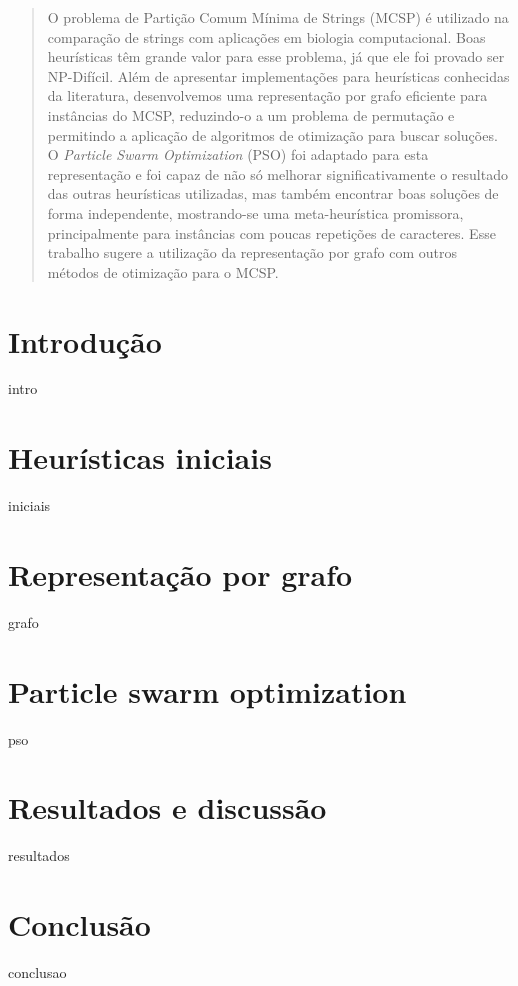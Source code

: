 \documentclass[11pt,twoside]{article}
\begin{document}

    \begin{abstract}
        O problema de Partição Comum Mínima de Strings (MCSP) é utilizado na comparação de strings com aplicações em biologia computacional. Boas heurísticas têm grande valor para esse problema, já que ele foi provado ser NP-Difícil. Além de apresentar implementações para heurísticas conhecidas da literatura, desenvolvemos uma representação por grafo eficiente para instâncias do MCSP, reduzindo-o a um problema de permutação e permitindo a aplicação de algoritmos de otimização para buscar soluções. O \textit{Particle Swarm Optimization} (PSO) foi adaptado para esta representação e foi capaz de não só melhorar significativamente o resultado das outras heurísticas utilizadas, mas também encontrar boas soluções de forma independente, mostrando-se uma meta-heurística promissora, principalmente para instâncias com poucas repetições de caracteres. Esse trabalho sugere a utilização da representação por grafo com outros métodos de otimização para o MCSP.
    \end{abstract}

    \raggedbottom

    \section{Introdução}
        {intro}

    \section{Heurísticas iniciais}
        {iniciais}

    \section{Representação por grafo}
        {grafo}

    \section{Particle swarm optimization}
        {pso}

    \section{Resultados e discussão}
        {resultados}

    \section{Conclusão}
        {conclusao}

    \printbibliography[filter=footies]
\end{document}
